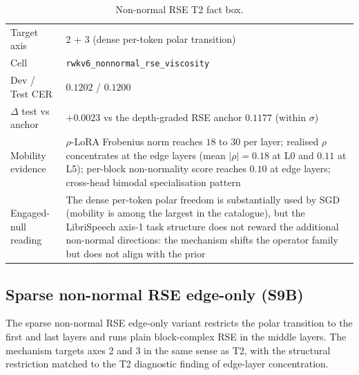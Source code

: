 \begin{table}[h]
\centering
\small
\caption[Non-normal RSE T2 engaged-null entry]{Non-normal RSE T2
fact box.}
\label{tab:engaged-null:t2}
\setlength{\tabcolsep}{6pt}
\renewcommand{\arraystretch}{1.05}
\begin{tabularx}{\linewidth}{@{}p{3.3cm} X@{}}
\toprule
Target axis & 2 + 3 (dense per-token polar transition) \\
Cell & \texttt{rwkv6\_nonnormal\_rse\_viscosity} \\
Dev / Test CER & $0.1202$ / $0.1200$ \\
$\Delta$ test vs anchor & $+0.0023$ vs the depth-graded RSE anchor
$0.1177$ (within $\sigma$) \\
Mobility evidence & $\rho$-LoRA Frobenius norm reaches $18$ to $30$
per layer; realised $\rho$ concentrates at the edge layers (mean
$|\rho| = 0.18$ at L0 and $0.11$ at L5); per-block non-normality
score reaches $0.10$ at edge layers; cross-head bimodal
specialisation pattern \\
Engaged-null reading & The dense per-token polar freedom is
substantially used by SGD (mobility is among the largest in the
catalogue), but the LibriSpeech axis-1 task structure does not
reward the additional non-normal directions: the mechanism shifts
the operator family but does not align with the prior \\
\bottomrule
\end{tabularx}
\end{table}

\subsection{Sparse non-normal RSE edge-only
(S9B)}\label{app:engaged-null:s9b}

The sparse non-normal RSE edge-only variant restricts the polar
transition to the first and last layers and runs plain block-complex
RSE in the middle layers. The mechanism targets axes 2 and 3 in the
same sense as T2, with the structural restriction matched to the
T2 diagnostic finding of edge-layer concentration.

